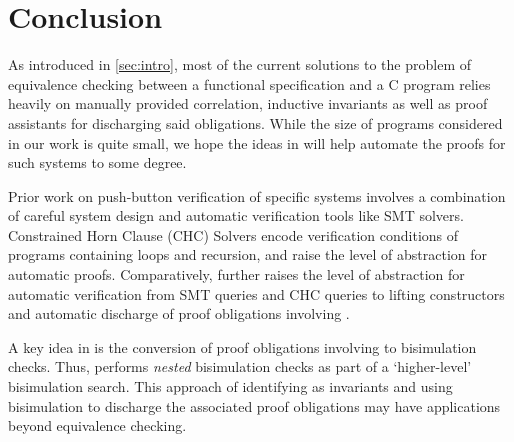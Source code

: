 \chapter{Conclusion}
\label{sec:conclusion}
As introduced in \cref{sec:intro}, most of the current solutions
to the problem of equivalence checking between a functional specification
and a C program relies heavily on manually provided correlation, inductive
invariants as well as proof assistants for discharging said obligations.
While the size of programs considered in our work is quite small,
we hope the ideas in \toolName{} will help
automate the proofs for such systems to some degree.

Prior work on push-button verification of specific
systems \cite{fscq,hyperkernel,serval,verifiedBPF}
involves a combination of careful system design and
automatic verification tools like SMT solvers.
Constrained Horn Clause (CHC) Solvers \cite{CHCeq}
encode verification conditions of programs containing loops and recursion,
and raise the level of abstraction for automatic proofs.
Comparatively, \toolName{} further raises the level
of abstraction for automatic verification from
SMT queries and CHC queries to lifting constructors and automatic discharge of
proof obligations involving \recursiveRelations{}.

A key idea in \toolName{} is the conversion of proof
obligations involving \recursiveRelations{} to
bisimulation checks. Thus, \toolName{} performs {\em nested}
bisimulation checks as part of a `higher-level'
bisimulation search. This approach of
identifying \recursiveRelations{} as invariants and using
bisimulation to discharge the associated
proof obligations may have applications
beyond equivalence checking.
